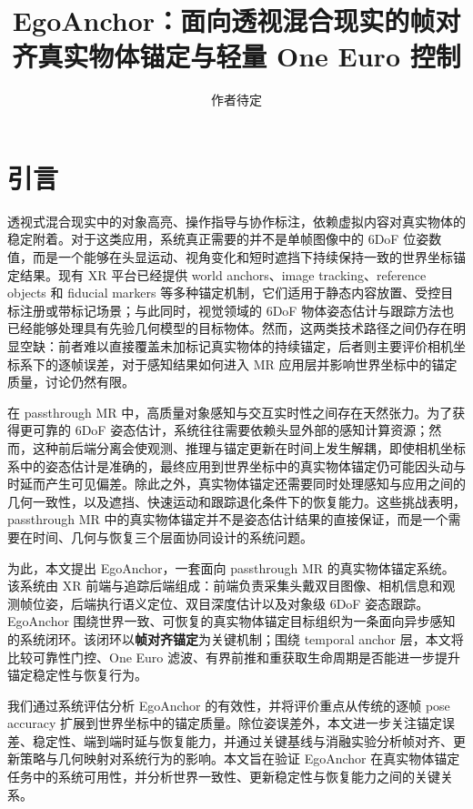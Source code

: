 \documentclass[review]{vgtc}
\title{EgoAnchor：面向透视混合现实的帧对齐真实物体锚定与轻量 One Euro 控制}
\author{作者待定}
\begin{document}
\maketitle

\section{引言}

透视式混合现实中的对象高亮、操作指导与协作标注，依赖虚拟内容对真实物体的稳定附着。对于这类应用，系统真正需要的并不是单帧图像中的 6DoF 位姿数值，而是一个能够在头显运动、视角变化和短时遮挡下持续保持一致的世界坐标锚定结果。现有 XR 平台已经提供 world anchors、image tracking、reference objects 和 fiducial markers 等多种锚定机制，它们适用于静态内容放置、受控目标注册或带标记场景；与此同时，视觉领域的 6DoF 物体姿态估计与跟踪方法也已经能够处理具有先验几何模型的目标物体。然而，这两类技术路径之间仍存在明显空缺：前者难以直接覆盖未加标记真实物体的持续锚定，后者则主要评价相机坐标系下的逐帧误差，对于感知结果如何进入 MR 应用层并影响世界坐标中的锚定质量，讨论仍然有限。

在 passthrough MR 中，高质量对象感知与交互实时性之间存在天然张力。为了获得更可靠的 6DoF 姿态估计，系统往往需要依赖头显外部的感知计算资源；然而，这种前后端分离会使观测、推理与锚定更新在时间上发生解耦，即使相机坐标系中的姿态估计是准确的，最终应用到世界坐标中的真实物体锚定仍可能因头动与时延而产生可见偏差。除此之外，真实物体锚定还需要同时处理感知与应用之间的几何一致性，以及遮挡、快速运动和跟踪退化条件下的恢复能力。这些挑战表明，passthrough MR 中的真实物体锚定并不是姿态估计结果的直接保证，而是一个需要在时间、几何与恢复三个层面协同设计的系统问题。

为此，本文提出 EgoAnchor，一套面向 passthrough MR 的真实物体锚定系统。该系统由 XR 前端与追踪后端组成：前端负责采集头戴双目图像、相机信息和观测帧位姿，后端执行语义定位、双目深度估计以及对象级 6DoF 姿态跟踪。EgoAnchor 围绕世界一致、可恢复的真实物体锚定目标组织为一条面向异步感知的系统闭环。该闭环以\textbf{帧对齐锚定}为关键机制；围绕 temporal anchor 层，本文将比较可靠性门控、One Euro 滤波、有界前推和重获取生命周期是否能进一步提升锚定稳定性与恢复行为。

我们通过系统评估分析 EgoAnchor 的有效性，并将评价重点从传统的逐帧 pose accuracy 扩展到世界坐标中的锚定质量。除位姿误差外，本文进一步关注锚定误差、稳定性、端到端时延与恢复能力，并通过关键基线与消融实验分析帧对齐、更新策略与几何映射对系统行为的影响。本文旨在验证 EgoAnchor 在真实物体锚定任务中的系统可用性，并分析世界一致性、更新稳定性与恢复能力之间的关键关系。
\end{document}
